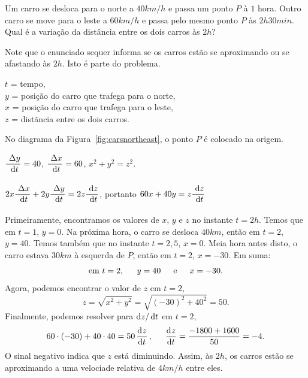 \begin{example}
Um carro se desloca para o norte a $40\si{km/h}$ e passa um ponto $P$
à $1$ hora. Outro carro se move para o leste a $60\si{km/h}$ e
passa pelo mesmo ponto $P$ às $2\si{h}30\si{min}$. Qual é a variação
da distância entre os dois carros às $2\si{h}$?

Note que o enunciado sequer informa se os carros estão se
aproximando ou se afastando às $2\si{h}$. Isto é parte do problema.
\begin{stepanalysis}
\item $t$ = tempo,\\
      $y$ = posição do carro que trafega para o norte,\\
      $x$ = posição do carro que trafega para o leste,\\
      $z$ = distãncia entre os dois carros.

      No diagrama da Figura~\ref{fig:carsnortheast}, o ponto $P$ é
      colocado na origem.
\item $\dsfrac{\dy}{\dt} = 40$, \hspace{1.5em}
      $\dsfrac{\dx}{\dt} = 60$, \hspace{1.5em}
      $x^2 + y^2 = z^2$.
\item $2x\dsfrac{\dx}{\dt} + 2y\dsfrac{\dy}{\dt} = 2z\dsfrac{\dz}{\dt}$,
      \;\;\; portanto \;\;\; $60x + 40y = z\dsfrac{\dz}{\dt}$
\item Primeiramente, encontramos os valores de $x$, $y$ e $z$ no instante
      $t = 2\si{h}$. Temos que em $t = 1$, $y = 0$. Na próxima hora, o
      carro se desloca $40\si{km}$, então em $t = 2$, $y = 40$. Temos também
      que no instante $t = 2,5$, $x = 0$. Meia hora antes disto, o carro
      estava $30\si{km}$ à esquerda de $P$, então em $t = 2$, $x = -30$.
      Em suma:
      $$
        \text{em } t = 2, \hspace{1.5em} y = 40 \hspace{1.5em} \text{e}
          \hspace{1.5em} x = -30.
      $$
      Agora, podemos encontrar o valor de $z$ em $t = 2$,
      $$
        z = \sqrt{x^2 + y^2} = \sqrt{(-30)^2 + 40^2} = 50.
      $$
      Finalmente, podemos resolver para $\dz/\dt$ em $t = 2$,
      $$
        60 \cdot (-30) + 40 \cdot 40 = 50 \dod z t, \hspace{1.5em}
          \dod z t = \frac{-1800 + 1600}{50} = -4.
      $$
      O sinal negativo indica que $z$ está diminuindo. Assim, às
      $2\si{h}$, os carros estão se aproximando a uma velociade
      relativa de $4\si{km/h}$ entre eles.
\end{stepanalysis}
\end{example}

